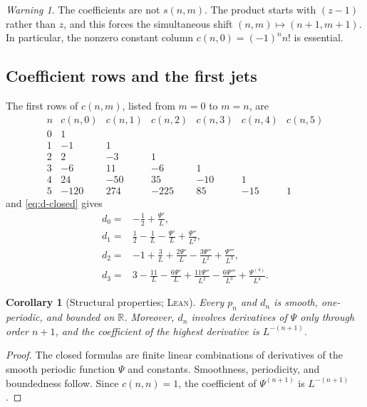 \documentclass[11pt,oneside]{article}
\newtheorem{corollary}[theorem]{Corollary}
\theoremstyle{definition}
\theoremstyle{remark}
\newtheorem{warning}[theorem]{Warning}
\newcommand{\R}{\mathbb R}
\newcommand{\Formalized}{\textsc{Lean}}
\begin{document}
\begin{warning}
The coefficients are not $s(n,m)$.  The product starts with $(z-1)$
rather than $z$, and this forces the simultaneous shift
$(n,m)\mapsto(n+1,m+1)$.  In particular, the nonzero constant column
$c(n,0)=(-1)^nn!$ is essential.
\end{warning}

\subsection{Coefficient rows and the first jets}

The first rows of $c(n,m)$, listed from $m=0$ to $m=n$, are
\[
\begin{array}{c|rrrrrr}
n&c(n,0)&c(n,1)&c(n,2)&c(n,3)&c(n,4)&c(n,5)\\
\hline
0&1\\
1&-1&1\\
2&2&-3&1\\
3&-6&11&-6&1\\
4&24&-50&35&-10&1\\
5&-120&274&-225&85&-15&1
\end{array}
\]
and \eqref{eq:d-closed} gives
\begin{align}
 d_0={}&-\frac12+\frac{\Psi'}L, \label{eq:d0-explicit}\\
 d_1={}&\frac12-\frac1L-\frac{\Psi'}L+\frac{\Psi''}{L^2},
 \label{eq:d1-explicit}\\
 d_2={}&-1+\frac3L+\frac{2\Psi'}L
       -\frac{3\Psi''}{L^2}+\frac{\Psi'''}{L^3},
 \label{eq:d2-explicit}\\
 d_3={}&3-\frac{11}{L}-\frac{6\Psi'}L
       +\frac{11\Psi''}{L^2}-\frac{6\Psi'''}{L^3}
       +\frac{\Psi^{(4)}}{L^4}. \label{eq:d3-explicit}
\end{align}

\begin{corollary}[Structural properties; \Formalized]
\label{cor:jet-structure}
Every $p_n$ and $d_n$ is smooth, one-periodic, and bounded on $\R$.
Moreover, $d_n$ involves derivatives of $\Psi$ only through order $n+1$,
and the coefficient of the highest derivative is $L^{-(n+1)}$.
\end{corollary}

\begin{proof}
The closed formulas are finite linear combinations of derivatives of the
smooth periodic function $\Psi$ and constants.  Smoothness, periodicity,
and boundedness follow.  Since $c(n,n)=1$, the coefficient of
$\Psi^{(n+1)}$ is $L^{-(n+1)}$.
\end{proof}
\end{document}
